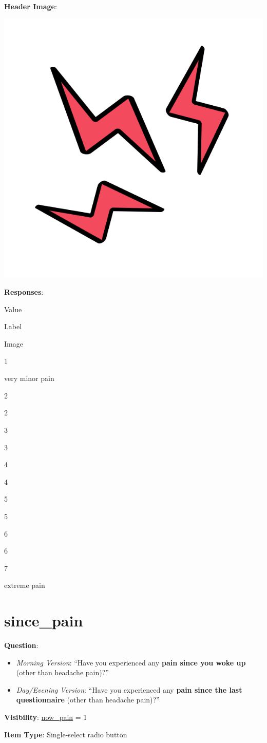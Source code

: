 \documentclass[]{book}
\providecommand{\tightlist}{%
  \setlength{\itemsep}{0pt}\setlength{\parskip}{0pt}}
\begin{document}
\textbf{Header Image}:

\begin{flushleft}\includegraphics[width=0.33\linewidth]{downloadFigs4latex_NIMH_Applet_Codebook/now_pain_level_headerImg} \end{flushleft}

\textbf{Responses}:

Value

Label

Image

1

very minor pain

2

2

3

3

4

4

5

5

6

6

7

extreme pain

\hypertarget{since_pain}{%
\section{since\_pain}\label{since_pain}}

\textbf{Question}:

\begin{itemize}
\tightlist
\item
  \emph{Morning Version}: ``Have you experienced any \textbf{pain since you woke up} (other than headache pain)?''
\item
  \emph{Day/Evening Version}: ``Have you experienced any \textbf{pain since the last questionnaire} (other than headache pain)?''
\end{itemize}

\textbf{Visibility}: \protect\hyperlink{now_pain}{now\_pain} = 1

\textbf{Item Type}: Single-select radio button
\end{document}
